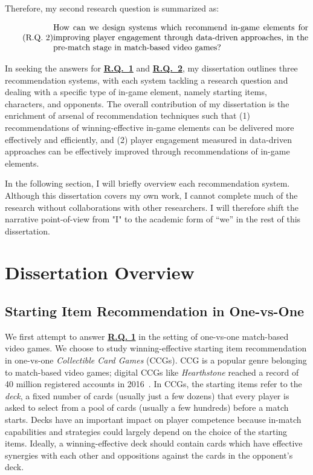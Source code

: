Therefore, my second research question is summarized as:

\begin{equation}
  \tag{R.Q. 2}\label{rq2}
  \parbox{\dimexpr\linewidth-4em}{%
    \strut
    How can we design systems which recommend in-game elements for improving player engagement through data-driven approaches, in the pre-match stage in match-based video games?
    \strut
  }
\end{equation}


In seeking the answers for \hyperref[rq1]{\textbf{R.Q.~1}} and \hyperref[rq2]{\textbf{R.Q.~2}}, my dissertation outlines three recommendation systems, with each system tackling a research question and dealing with a specific type of in-game element, namely starting items, characters, and opponents. The overall contribution of my dissertation is the enrichment of  arsenal of recommendation techniques such that (1) recommendations of winning-effective in-game elements can be delivered more effectively and efficiently, and (2) player engagement measured in data-driven approaches can be effectively improved through recommendations of in-game elements.

In the following section, I will briefly overview each recommendation system. Although this dissertation covers my own work, I cannot complete much of the research without collaborations with other researchers. I will therefore shift the narrative point-of-view from "I" to the academic form of “we” in the rest of this dissertation.


\section{Dissertation Overview}\label{sec:thesis_overview}

\subsection{Starting Item Recommendation in One-vs-One}\label{sec:thesis_overview:item_recom}

We first attempt to answer \hyperref[rq1]{\textbf{R.Q. 1}} in the setting of one-vs-one match-based video games. We choose to study winning-effective starting item recommendation in one-vs-one \textit{Collectible Card Games} (CCGs). CCG is a popular genre belonging to match-based video games; digital CCGs like \textit{Hearthstone} reached a record of 40 million registered accounts in 2016~\cite{hearthstonepopular}. In CCGs, the starting items refer to the \textit{deck}, a fixed number of cards (usually just a few dozens) that every player is asked to select from a pool of cards (usually a few hundreds) before a match starts. Decks have an important impact on player competence because in-match capabilities and strategies could largely depend on the choice of the starting items. Ideally, a winning-effective deck should contain cards which have effective synergies with each other and oppositions against the cards in the opponent's deck. 


